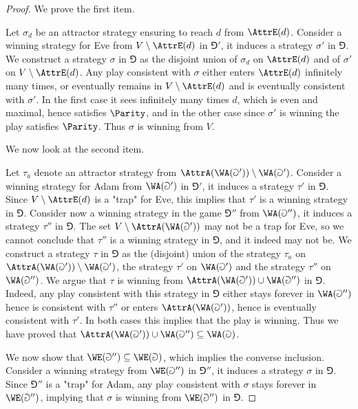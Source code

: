 
\begin{proof}
We prove the first item. 

Let $\sigma_d$ be an attractor strategy ensuring to reach $d$ from $\AttrE(d)$.
Consider a winning strategy for Eve from $V \setminus \AttrE(d)$ in $\Game'$, it induces a strategy $\sigma'$ in $\Game$.
We construct a strategy $\sigma$ in $\Game$ as the disjoint union of $\sigma_d$ on $\AttrE(d)$ and of $\sigma'$ on $V \setminus \AttrE(d)$.
Any play consistent with $\sigma$ either enters $\AttrE(d)$ infinitely many times, 
or eventually remains in $V \setminus \AttrE(d)$ and is eventually consistent with $\sigma'$.
In the first case it sees infinitely many times $d$, which is even and maximal, hence satisfies $\Parity$, 
and in the other case since $\sigma'$ is winning the play satisfies $\Parity$.
Thus $\sigma$ is winning from $V$.

We now look at the second item.

Let $\tau_a$ denote an attractor strategy %
from $\AttrA(\WA(\Game')) \setminus \WA(\Game')$.
Consider a winning strategy for Adam from $\WA(\Game')$ in $\Game'$, it induces a strategy $\tau'$ in $\Game$.
Since $V \setminus \AttrE(d)$ is a "trap" for Eve, this implies that $\tau'$ is a winning strategy in $\Game$.
Consider now a winning strategy in the game $\Game''$ from $\WA(\Game'')$, it induces a strategy $\tau''$ in $\Game$.
The set $V \setminus \AttrA( \WA(\Game') )$ may not be a trap for Eve, so we cannot conclude that $\tau''$ is a winning strategy in $\Game$,
and it indeed may not be.
We construct a strategy $\tau$ in $\Game$ as the (disjoint) union of the strategy $\tau_a$ on $\AttrA(\WA(\Game')) \setminus \WA(\Game')$,
the strategy $\tau'$ on $\WA(\Game')$ and the strategy $\tau''$ on $\WA(\Game'')$.
We argue that $\tau$ is winning from $\AttrA( \WA(\Game') ) \cup \WA(\Game'')$ in $\Game$.
Indeed, any play consistent with this strategy in $\Game$ either stays forever in $\WA(\Game'')$ hence is consistent with $\tau''$
or enters $\AttrA( \WA(\Game') )$, hence is eventually consistent with $\tau'$.
In both cases this implies that the play is winning.
Thus we have proved that $\AttrA( \WA(\Game') ) \cup \WA(\Game'') \subseteq \WA(\Game)$.

We now show that $\WE(\Game'') \subseteq \WE(\Game)$, which implies the converse inclusion.
Consider a winning strategy from $\WE(\Game'')$ in $\Game''$, it induces a strategy $\sigma$ in $\Game$.
Since $\Game''$ is a "trap" for Adam, any play consistent with $\sigma$ stays forever in $\WE(\Game'')$, 
implying that $\sigma$ is winning from $\WE(\Game'')$ in $\Game$.
\end{proof}

